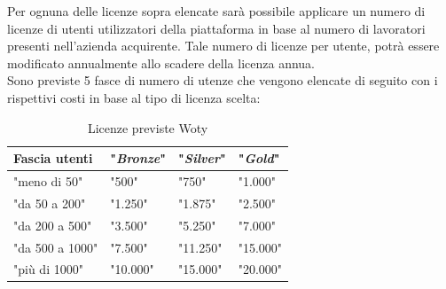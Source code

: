 Per ognuna delle licenze sopra elencate sarà possibile applicare un numero di licenze di utenti utilizzatori della piattaforma in base al numero di lavoratori presenti nell'azienda acquirente. Tale numero di licenze per utente, potrà essere modificato annualmente allo scadere della licenza annua.\\
Sono previste 5 fasce di numero di utenze che vengono elencate di seguito con i rispettivi costi in base al tipo di licenza scelta:

\begin{table}[ht]

\caption{Licenze previste Woty}
\centering
\begin{tabular}{|p{3cm}|p{}|p{}|p{}|}
\hline
\rule[-2mm]{0mm}{0.7cm}
\textbf{Fascia utenti} &	"\textbf{\textit{Bronze}}" 	& 	"\textbf{\textit{Silver}}" 	& 	"\textbf{\textit{Gold}}"\\
\hline
\rule[-2mm]{0mm}{0.7cm}
"meno di 50"	    &			"500\EUR"	        & 			"750\EUR"			& 			"1.000\EUR"		\\
\hline
\rule[-2mm]{0mm}{0.7cm}
"da 50 a 200"	&			"1.250\EUR"			& 			"1.875\EUR"			& 			"2.500\EUR"		\\
\hline
\rule[-2mm]{0mm}{0.7cm}
"da 200 a 500"	&			"3.500\EUR"			& 			"5.250\EUR"			& 			"7.000\EUR"		\\
\hline
\rule[-2mm]{0mm}{0.7cm}
"da 500 a 1000"	&			"7.500\EUR"			& 			"11.250\EUR"			& 			"15.000\EUR"		\\
\hline
\rule[-2mm]{0mm}{0.7cm}
"più di 1000"	&			"10.000\EUR"			& 			"15.000\EUR"			& 			"20.000\EUR"		\\
\hline
\end{tabular}
\end{table}

